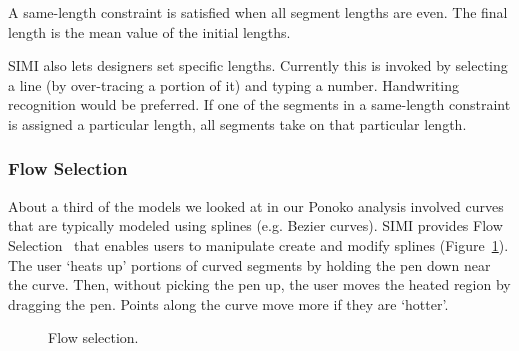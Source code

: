 \documentclass{article}
\begin{document}
A same-length constraint is satisfied when all segment lengths are
even. The final length is the mean value of the initial lengths.

SIMI also lets designers set specific lengths. Currently this is
invoked by selecting a line (by over-tracing a portion of it) and
typing a number. Handwriting recognition would be preferred. If one of
the segments in a same-length constraint is assigned a particular
length, all segments take on that particular length.

\subsubsection{Flow Selection}


About a third of the models we looked at in our Ponoko analysis
involved curves that are typically modeled using splines (e.g. Bezier
curves). SIMI provides Flow Selection~\cite{johnson-flow-selection}
that enables users to manipulate create and modify splines
(Figure~\ref{fig:fs}). The user `heats up' portions of curved segments
by holding the pen down near the curve. Then, without picking the pen
up, the user moves the heated region by dragging the pen. Points along
the curve move more if they are `hotter'. 

\begin{figure}[h]
\centering {}
\hspace{3mm}
\caption{Flow selection.}
\label{fig:fs}
\end{figure}
\end{document}
